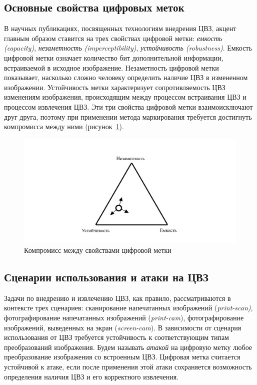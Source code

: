 \documentclass[12pt,a4paper]{article}
\begin{document}
\subsection{Основные свойства цифровых меток}
В научных публикациях, посвященных технологиям внедрения ЦВЗ, акцент главным образом ставится на трех свойствах цифровой метки: \textit{емкость (capacity)}, \textit{незаметность (imperceptibility)}, \textit{устойчивость (robustness)}.
Емкость цифровой метки означает количество бит дополнительной информации, встраиваемой в исходное изображение.
Незаметность цифровой метки показывает, насколько сложно человеку определить наличие ЦВЗ в измененном изображении.
Устойчивость метки  характеризует сопротивляемость ЦВЗ изменениям изображения, происходящим между процессом встраивания ЦВЗ и процессом извлечения ЦВЗ.
Эти три свойства цифровой метки взаимоисключают друг друга, поэтому при применении метода маркирования требуется достигнуть компромисса между ними (рисунок~\ref{fig:tradeoff}).
\begin{figure}[h]
	
	\centering
	
	\includegraphics[width=1.0\linewidth]{Tradeoff.png}
	
	\caption{Компромисс между свойствами цифровой метки}
	
	\label{fig:tradeoff}
	
\end{figure}
\subsection{Сценарии использования и атаки на ЦВЗ}
Задачи по внедрению и извлечению ЦВЗ, как правило, рассматриваются в контексте трех сценариев: сканирование напечатанных изображений (\textit{print-scan)}, фотографирование напечатанных изображений (\textit{print-cam}), фотографирование изображений, выведенных на экран (\textit{screen-cam}).
В зависимости от сценария использования от ЦВЗ требуется устойчивость к соответствующим типам преобразований изображения. Будем называть \textit{атакой} на цифровую метку любое преобразование изображения со встроенным ЦВЗ.
Цифровая метка считается устойчивой к атаке, если после применения этой атаки сохраняется возможность определения наличия ЦВЗ и его корректного извлечения.
\end{document}
